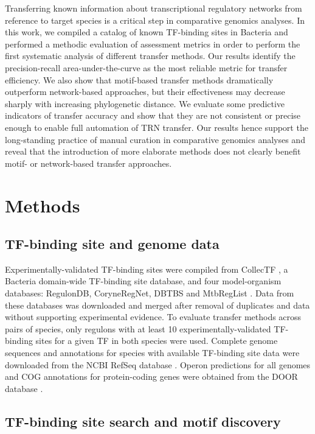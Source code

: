Transferring known information about transcriptional regulatory networks from
reference to target species is a critical step in comparative genomics
analyses. In this work, we compiled a catalog of known TF-binding sites in
Bacteria and performed a methodic evaluation of assessment metrics in order to
perform the first systematic analysis of different transfer methods. Our
results identify the precision-recall area-under-the-curve as the most reliable
metric for transfer efficiency. We also show that motif-based transfer methods
dramatically outperform network-based approaches, but their effectiveness may
decrease sharply with increasing phylogenetic distance. We evaluate some
predictive indicators of transfer accuracy and show that they are not
consistent or precise enough to enable full automation of TRN transfer. Our
results hence support the long-standing practice of manual curation in
comparative genomics analyses and reveal that the introduction of more
elaborate methods does not clearly benefit motif- or network-based transfer
approaches.

\section{Methods}

\subsection{TF-binding site and genome data}

Experimentally-validated TF-binding sites were compiled from CollecTF
\cite{kilic2013collectf}, a Bacteria domain-wide TF-binding site database, and
four model-organism databases: RegulonDB, CoryneRegNet, DBTBS and MtbRegList
\cite{jacques2005mtbreglist, sierro2008dbtbs, pauling2012coryneregnet,
  salgado2013regulondb}. Data from these databases was downloaded and merged
after removal of duplicates and data without supporting experimental
evidence. To evaluate transfer methods across pairs of species, only regulons
with at least 10 experimentally-validated TF-binding sites for a given TF in
both species were used. Complete genome sequences and annotations for species
with available TF-binding site data were downloaded from the NCBI RefSeq
database \cite{pruitt2007ncbi}. Operon predictions for all genomes and COG
annotations for protein-coding genes were obtained from the DOOR database
\cite{tatusov2000cog, mao2009door}.

\subsection{TF-binding site search and motif discovery}

